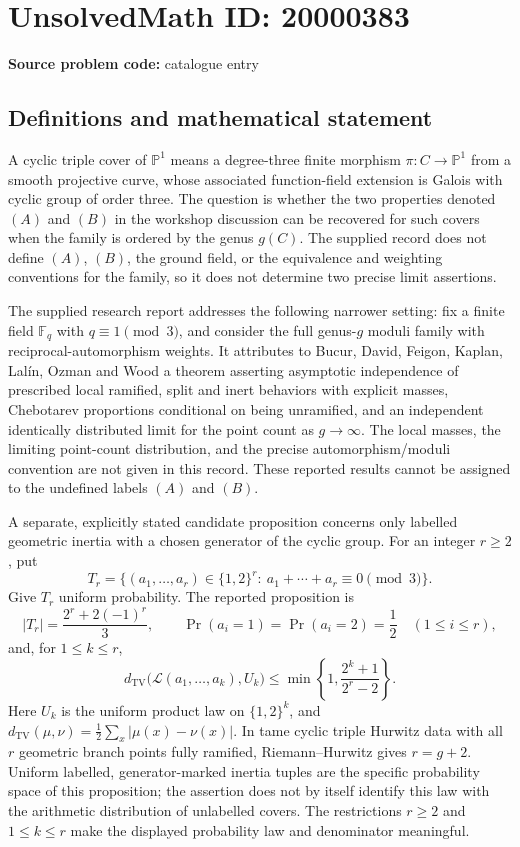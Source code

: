 \documentclass[11pt]{article}
\newcommand{\F}{\mathbb{F}}
\newcommand{\PP}{\mathbb{P}}
\begin{document}
\section*{UnsolvedMath ID: 20000383}
\textbf{Source problem code:} catalogue entry
\subsection{Definitions and mathematical statement}
A cyclic triple cover of \(\PP^1\) means a degree-three finite morphism \(\pi:C\to\PP^1\) from a smooth projective curve, whose associated function-field extension is Galois with cyclic group of order three. The question is whether the two properties denoted \((A)\) and \((B)\) in the workshop discussion can be recovered for such covers when the family is ordered by the genus \(g(C)\). The supplied record does not define \((A)\), \((B)\), the ground field, or the equivalence and weighting conventions for the family, so it does not determine two precise limit assertions.

The supplied research report addresses the following narrower setting: fix a finite field \(\F_q\) with \(q\equiv1\pmod3\), and consider the full genus-\(g\) moduli family with reciprocal-automorphism weights. It attributes to Bucur, David, Feigon, Kaplan, Lal\'in, Ozman and Wood a theorem asserting asymptotic independence of prescribed local ramified, split and inert behaviors with explicit masses, Chebotarev proportions conditional on being unramified, and an independent identically distributed limit for the point count as \(g\to\infty\). The local masses, the limiting point-count distribution, and the precise automorphism/moduli convention are not given in this record. These reported results cannot be assigned to the undefined labels \((A)\) and \((B)\).

A separate, explicitly stated candidate proposition concerns only labelled geometric inertia with a chosen generator of the cyclic group. For an integer \(r\ge2\), put
\[
 T_r=\{(a_1,\ldots,a_r)\in\{1,2\}^r:\ a_1+\cdots+a_r\equiv0\pmod3\}.
\]
Give \(T_r\) uniform probability. The reported proposition is
\[
 |T_r|=\frac{2^r+2(-1)^r}{3},\qquad
 \Pr(a_i=1)=\Pr(a_i=2)=\frac12\quad(1\le i\le r),
\]
and, for \(1\le k\le r\),
\[
 d_{\mathrm{TV}}\bigl(\mathcal L(a_1,\ldots,a_k),U_k\bigr)
 \le \min\left\{1,\frac{2^k+1}{2^r-2}\right\}.
\]
Here \(U_k\) is the uniform product law on \(\{1,2\}^k\), and \(d_{\mathrm{TV}}(\mu,\nu)=\tfrac12\sum_x|\mu(x)-\nu(x)|\). In tame cyclic triple Hurwitz data with all \(r\) geometric branch points fully ramified, Riemann--Hurwitz gives \(r=g+2\). Uniform labelled, generator-marked inertia tuples are the specific probability space of this proposition; the assertion does not by itself identify this law with the arithmetic distribution of unlabelled covers. The restrictions \(r\ge2\) and \(1\le k\le r\) make the displayed probability law and denominator meaningful.
\end{document}
